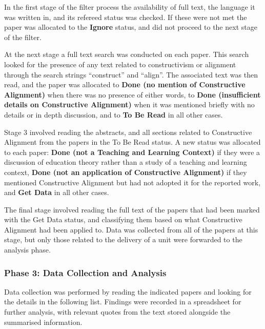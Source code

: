 In the first stage of the filter process the availability of full text, the language it was written in, and its refereed status was checked. If these were not met the paper was allocated to the \textbf{Ignore} status, and did not proceed to the next stage of the filter. 

At the next stage a full text search was conducted on each paper. This search looked for the presence of any text related to constructivism or alignment through the search strings ``construct'' and ``align''. The associated text was then read, and the paper was allocated to \textbf{Done (no mention of Constructive Alignment)} when there was no presence of either words, to \textbf{Done (insufficient details on Constructive Alignment)} when it was mentioned briefly with no details or in depth discussion, and to \textbf{To Be Read} in all other cases. %

Stage 3 involved reading the abstracts, and all sections related to Constructive Alignment from the papers in the To Be Read status. A new status was allocated to each paper: \textbf{Done (not a Teaching and Learning Context)} if they were a discussion of education theory rather than a study of a teaching and learning context, \textbf{Done (not an application of Constructive Alignment)} if they mentioned Constructive Alignment but had not adopted it for the reported work, and \textbf{Get Data} in all other cases.

The final stage involved reading the full text of the papers that had been marked with the Get Data status, and classifying them based on what Constructive Alignment had been applied to. Data was collected from all of the papers at this stage, but only those related to the delivery of a unit were forwarded to the analysis phase.


\subsubsection{Phase 3: Data Collection and Analysis} %
\label{ssub:data_collection_and_analysis}

Data collection was performed by reading the indicated papers and looking for the details in the following list. Findings were recorded in a spreadsheet for further analysis, with relevant quotes from the text stored alongside the summarised information.

